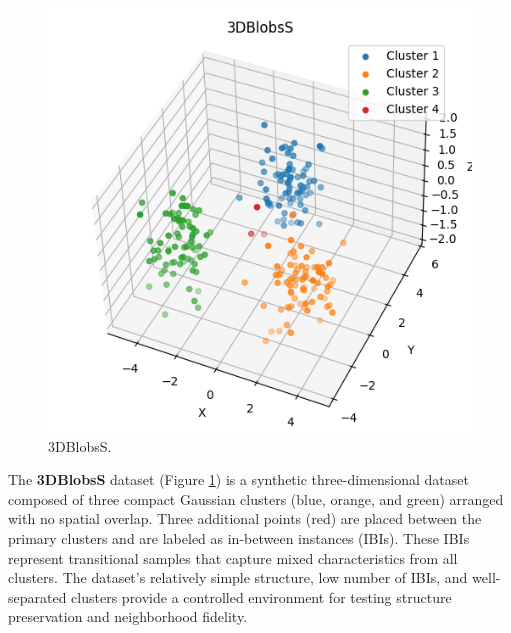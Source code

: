 \begin{figure}
    \centering
    \includegraphics[width=\myimgwidth]{images/datasets/3DBlobsS.png}
    \caption{3DBlobsS.}
    \label{fig:3DBlobsS}
\end{figure}
The \textbf{3DBlobsS} dataset (Figure \ref{fig:3DBlobsS}) is a synthetic three-dimensional dataset composed of three compact Gaussian clusters (blue, orange, and green) arranged with no spatial overlap. Three additional points (red) are placed between the primary clusters and are labeled as in-between instances (IBIs). These IBIs represent transitional samples that capture mixed characteristics from all clusters. The dataset’s relatively simple structure, low number of IBIs, and well-separated clusters provide a controlled environment for testing structure preservation and neighborhood fidelity.
\newline

